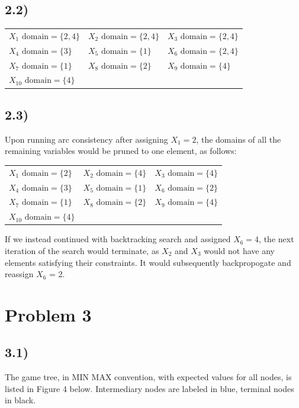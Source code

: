 \documentclass[11pt]{article}
\begin{document}
\subsection*{2.2)}
\begin{center}
\begin{tabular}{lll}
$X_1 \text{ domain} = \{2,4\}$ & $X_2 \text{ domain} = \{2,4\}$ & $X_3 \text{ domain} = \{2,4\}$ \\
$X_4 \text{ domain} = \{3\}$ & $X_5 \text{ domain} = \{1\}$ & $X_6 \text{ domain} = \{2,4\}$ \\
$X_7 \text{ domain} = \{1\}$ & $X_8 \text{ domain} = \{2\}$ & $X_9 \text{ domain} = \{4\}$ \\
$X_{10} \text{ domain} = \{4\}$ &                                &
\end{tabular}
\end{center}

\subsection*{2.3)}
Upon running arc consistency after assigning $X_1 = 2$, the domains of all the remaining variables would be pruned to one element, as follows:
\begin{center}
\begin{tabular}{lll}
$X_1 \text{ domain} = \{2\}$ & $X_2 \text{ domain} = \{4\}$ & $X_3 \text{ domain} = \{4\}$ \\
$X_4 \text{ domain} = \{3\}$ & $X_5 \text{ domain} = \{1\}$ & $X_6 \text{ domain} = \{2\}$ \\
$X_7 \text{ domain} = \{1\}$ & $X_8 \text{ domain} = \{2\}$ & $X_9 \text{ domain} = \{4\}$ \\
$X_{10} \text{ domain} = \{4\}$ &                                &
\end{tabular}
\end{center}

If we instead continued with backtracking search and assigned $X_6 = 4$, the next iteration of the search would terminate, as $X_2$ and $X_3$ would not have any elements satisfying their constraints. It would subsequently backpropogate and reassign $X_6$ = 2.

\newpage
\section*{Problem 3}

\subsection*{3.1)}
The game tree, in MIN MAX convention, with expected values for all nodes, is listed in Figure 4 below. Intermediary nodes are labeled in blue, terminal nodes in black.
\end{document}
